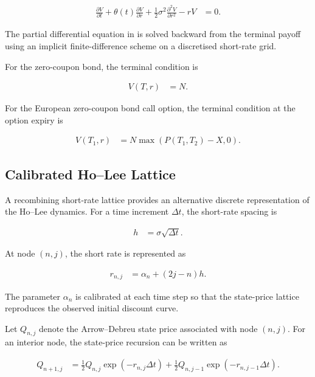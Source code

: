 \documentclass[11pt,a4paper]{article}
\numberwithin{equation}{section}
\begin{document}
\begin{align}
    \frac{\partial V}{\partial t}
    +
    \theta(t)\frac{\partial V}{\partial r}
    +
    \frac{1}{2}\sigma^2
    \frac{\partial^2 V}{\partial r^2}
    -
    rV
    &=
    0.
    \label{eq:ho_lee_pde}
\end{align}

The partial differential equation in  is solved
backward from the terminal payoff using an implicit finite-difference
scheme on a discretised short-rate grid.

For the zero-coupon bond, the terminal condition is

\begin{align*}
    V(T,r)
    &=
    N.
\end{align*}

For the European zero-coupon bond call option, the terminal condition at
the option expiry is

\begin{align*}
    V(T_1,r)
    &=
    N\max\left(P(T_1,T_2)-X,0\right).
\end{align*}


\subsection{Calibrated Ho--Lee Lattice}

A recombining short-rate lattice provides an alternative discrete
representation of the Ho--Lee dynamics. For a time increment $\Delta t$,
the short-rate spacing is

\begin{align*}
    h
    &=
    \sigma\sqrt{\Delta t}.
\end{align*}

At node $(n,j)$, the short rate is represented as

\begin{align*}
    r_{n,j}
    &=
    \alpha_n+(2j-n)h.
\end{align*}

The parameter $\alpha_n$ is calibrated at each time step so that the
state-price lattice reproduces the observed initial discount curve.

Let $Q_{n,j}$ denote the Arrow--Debreu state price associated with node
$(n,j)$. For an interior node, the state-price recursion can be written
as

\begin{align*}
    Q_{n+1,j}
    &=
    \frac{1}{2}
    Q_{n,j}
    \exp(-r_{n,j}\Delta t)
    +
    \frac{1}{2}
    Q_{n,j-1}
    \exp(-r_{n,j-1}\Delta t).
\end{align*}
\end{document}
